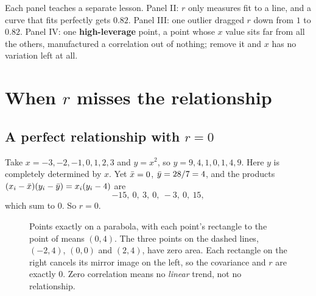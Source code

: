 Each panel teaches a separate lesson. Panel II: $r$ only measures fit to a line,
and a curve that fits perfectly gets $0.82$. Panel III: one outlier dragged $r$
down from $1$ to $0.82$. Panel IV: one \textbf{high-leverage} point, a point whose
$x$ value sits far from all the others, manufactured a correlation out of nothing; remove it and $x$ has no variation left at all.

\section{When $r$ misses the relationship}
\label{sec:corr-nonlinear}

\subsection{A perfect relationship with $r = 0$}

Take $x = -3, -2, -1, 0, 1, 2, 3$ and $y = x^2$, so $y = 9,4,1,0,1,4,9$. Here $y$
is completely determined by $x$. Yet $\bar{x} = 0$, $\bar{y} = 28/7 = 4$, and the
products $(x_i - \bar{x})(y_i - \bar{y}) = x_i(y_i - 4)$ are
\[
  -15,\ 0,\ 3,\ 0,\ -3,\ 0,\ 15,
\]
which sum to $0$. So $r = 0$.

\begin{figure}[H]
\centering
{}
\caption{Points exactly on a parabola, with each point's rectangle to the point of
means $(0, 4)$. The three points on the dashed lines, $(-2,4)$, $(0,0)$ and
$(2,4)$, have zero area. Each rectangle on the right cancels its mirror image on
the left, so the covariance and $r$ are exactly $0$. Zero correlation means no
\emph{linear} trend, not no relationship.}
\label{fig:two-variables-parabola}
\end{figure}

